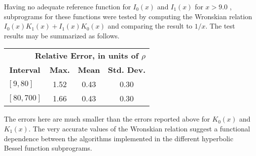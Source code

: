 \documentclass[twoside]{MATH77}
\begin{document}
Having no adequate reference function for $I_0(x)$ and $I_1(x)$ for $x > 9.0$%
, subprograms for these functions were tested by computing the Wronskian
relation $I_0(x)K_1(x) + I_1(x)K_0(x)$ and comparing the result to $1/x$.
The test results may be summarized as follows.

\begin{tabular}{lccc}
 \multicolumn{4}{r}{\bf Relative Error, in units of $\rho $}\\
 \multicolumn{1}{c}{\bf Interval} &
  \multicolumn{1}{c}{\bf Max.} & \multicolumn{1}{c}{\bf Mean} &
  \multicolumn{1}{c}{\bf Std. Dev.}\\
 $[9, 80]$ & 1.52 & 0.43 & 0.30\\
 $[80, 700]$ & 1.66 & 0.43 & 0.30
\end{tabular}

The errors here are much smaller than the errors reported above for $K_0(x)$
and $K_1(x)$. The very accurate values of the Wronskian relation suggest a
functional dependence between the algorithms implemented in the different
hyperbolic Bessel function subprograms.
\end{document}
